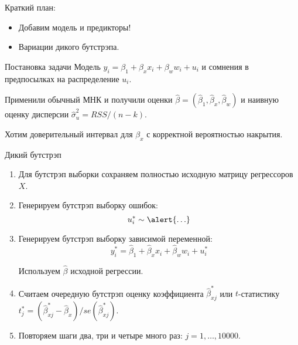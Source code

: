 
\begin{frame} %

  
  \end{frame}
  
  
  
  \begin{frame}{Краткий план:}
    \begin{itemize}[<+->]
      \item Добавим модель и предикторы!
      \item Вариации дикого бутстрэпа.
    \end{itemize}
  \end{frame}
  
  
  
  \begin{frame}{Постановка задачи}
  Модель $y_i = \beta_1 + \beta_x x_i + \beta_w w_i + u_i$ и \alert{сомнения} в предпосылках на распределение $u_i$. 
  
  \pause
  Применили обычный МНК и получили оценки $\hat \beta = (\hat \beta_1, \hat \beta_x, \hat \beta_w)$ и
  наивную оценку дисперсии $\hat \sigma^2_u = RSS / (n - k)$.
  
  \pause
  Хотим доверительный интервал для $\beta_x$ с корректной вероятностью накрытия. 
  \end{frame}
  
  
  
  \begin{frame}{Дикий бутстрэп}
  
    \begin{enumerate}[<+->]
      \item Для бутстрэп выборки сохраняем полностью исходную матрицу регрессоров $X$.
      \item Генерируем бутстрэп выборку ошибок:
      \[
       u^*_i \sim \alert{\ldots}
      \]
      \item Генерируем бутстрэп выборку зависимой переменной:
      \[
        y^*_i = \hat \beta_1 + \hat\beta_x x_i + \hat \beta_w w_i + u^*_i
      \]
      
      \pause
      Используем $\hat\beta$ \alert{исходной регрессии}.
  
  \item Считаем очередную бутстрэп оценку коэффициента $\hat \beta^*_{xj}$ или $t$-статистику 
  $t^*_{j} = (\hat \beta^*_{xj} - \hat\beta_x)/se(\hat \beta^*_{xj})$.
        \item Повторяем шаги два, три и четыре много раз: $j= 1, \ldots, 10000$.
  \end{enumerate}
    
  \end{frame}
  

